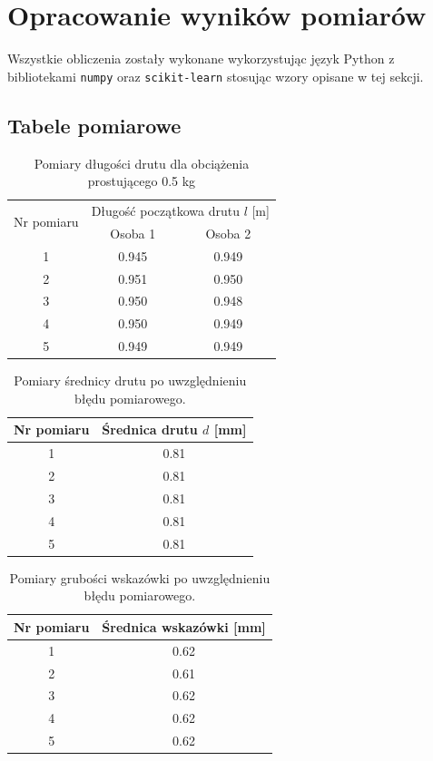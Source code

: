\documentclass[a4paper,12pt]{article}
\begin{document}
\label{sec:opracowanie_wynikow}
\section{Opracowanie wyników pomiarów}

Wszystkie obliczenia zostały wykonane wykorzystując język Python z bibliotekami \texttt{numpy} oraz \texttt{scikit-learn} stosując wzory opisane w tej sekcji.
\subsection{Tabele pomiarowe}

\begin{table}[H]
    \centering
    \begin{tabular}{|c|c|c|}
        \hline
        \multirow{2}{*}{Nr pomiaru} & \multicolumn{2}{c|}{Długość początkowa drutu $l$ [m]} \\
        \cline{2-3}
        & Osoba 1 & Osoba 2 \\
        \hline
        1  & 0.945 & 0.949 \\ \hline
        2  & 0.951 & 0.950 \\ \hline
        3  & 0.950 & 0.948 \\ \hline
        4  & 0.950 & 0.949 \\ \hline
        5  & 0.949 & 0.949 \\ \hline
    \end{tabular}
    \caption{Pomiary długości drutu dla obciążenia prostującego 0.5 kg}
    \label{tab:wire_len}
\end{table}


\begin{table}[H]
    \centering
    \begin{tabular}{|c|c|}
        \hline
        Nr pomiaru & Średnica drutu $d$ [mm] \\
        \hline
        1 & 0.81 \\ \hline
        2 & 0.81 \\ \hline
        3 & 0.81 \\ \hline
        4 & 0.81 \\ \hline
        5 & 0.81 \\ \hline
    \end{tabular}
    \caption{Pomiary średnicy drutu po uwzględnieniu błędu pomiarowego.}
    \label{tab:srednica_drutu}
\end{table}

\begin{table}[H]
    \centering
    \begin{tabular}{|c|c|}
        \hline
        Nr pomiaru & Średnica wskazówki [mm] \\
        \hline
        1 & 0.62 \\ \hline
        2 & 0.61 \\ \hline
        3 & 0.62 \\ \hline
        4 & 0.62 \\ \hline
        5 & 0.62 \\ \hline
    \end{tabular}
    \caption{Pomiary grubości wskazówki po uwzględnieniu błędu pomiarowego.}
    \label{tab:srednica_wskazowki}
\end{table}
\end{document}
